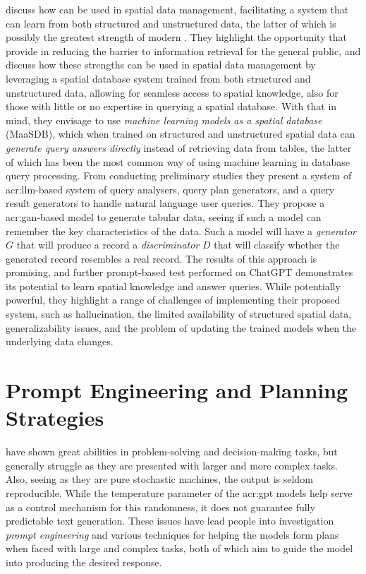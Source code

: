 \cite{qiMaaSDBSpatialDatabases2023} discuss how  can be used in spatial data management, facilitating a system that can learn from both structured and unstructured data, the latter of which is possibly the greatest strength of modern . They highlight the opportunity that  provide in reducing the barrier to information retrieval for the general public, and discuss how these strengths can be used in spatial data management by leveraging a spatial database system trained from both structured and unstructured data, allowing for seamless access to spatial knowledge, also for those with little or no expertise in querying a spatial database. With that in mind, they envisage to use \textit{machine learning models as a spatial database} (MaaSDB), which when trained on structured and unstructured spatial data can \textit{generate query answers directly} instead of retrieving data from tables, the latter of which has been the most common way of using machine learning in database query processing. From conducting preliminary studies they present a system of \acrshort{acr:llm}-based system of query analysers, query plan generators, and a query result generators to handle natural language user queries. They propose a \gls{acr:gan}-based model to generate tabular data, seeing if such a model can remember the key characteristics of the data. Such a model will have a \textit{generator} $G$ that will produce a record a \textit{discriminator} $D$ that will classify whether the generated record resembles a real record. The results of this approach is promising, and further prompt-based test performed on ChatGPT demonstrates its potential to learn spatial knowledge and answer queries. While potentially powerful, they highlight a range of challenges of implementing their proposed system, such as hallucination, the limited availability of structured spatial data, generalizability issues, and the problem of updating the trained models when the underlying data changes.



\section{Prompt Engineering and Planning Strategies}\label{sec:prompt-engineering-and-planning-strategies}

 have shown great abilities in problem-solving and decision-making tasks, but generally struggle as they are presented with larger and more complex tasks. Also, seeing as they are pure stochastic machines, the output is seldom reproducible. While the temperature parameter of the \acrshort{acr:gpt} models help serve as a control mechanism for this randomness, it does not guarantee fully predictable text generation. These issues have lead people into investigation \textit{prompt engineering} and various techniques for helping the models form plans when faced with large and complex tasks, both of which aim to guide the model into producing the desired response.

